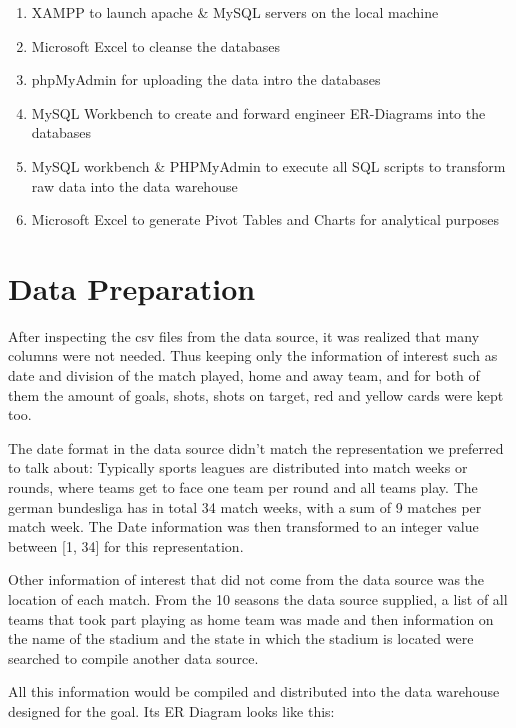 \documentclass[11pt, journal]{IEEEtran}
\begin{document}
\begin{enumerate}
\item XAMPP to launch apache \& MySQL servers on the local machine
\item Microsoft Excel to cleanse the databases
\item phpMyAdmin for uploading the data intro the databases
\item MySQL Workbench to create and forward engineer ER-Diagrams into the databases
\item MySQL workbench \& PHPMyAdmin to execute all SQL scripts to transform raw data into the data warehouse
\item Microsoft Excel to generate Pivot Tables and Charts for analytical purposes
\end{enumerate}
 
\section{Data Preparation} \label{sec:impl}
After inspecting the csv files from the data source, it was realized that many columns were not needed. Thus keeping only
the information of interest such as date and division of the match played, home and away team, and for both of them the amount of goals,
shots, shots on target, red and yellow cards were kept too.

The date format in the data source didn't match the representation we preferred to talk about: Typically sports leagues are distributed into 
match weeks or rounds, where teams get to face one team per round and all teams play. The german bundesliga has in total 34 match weeks, with a
sum of 9 matches per match week. The Date information was then transformed to an integer value between [1, 34] for this representation.

Other information of interest that did not come from the data source was the location of each match. From the 10 seasons the data source supplied,
a list of all teams that took part playing as home team was made and then information on the name of the stadium and the state in which the stadium
is located were searched to compile another data source.

All this information would be compiled and distributed into the data warehouse designed for the goal. Its ER Diagram looks like this:
\end{document}
